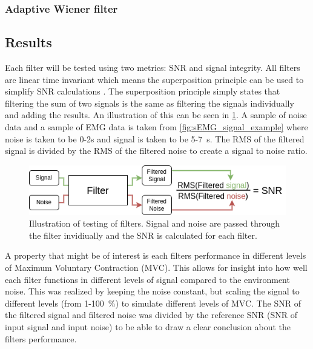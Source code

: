\subsubsection{Adaptive Wiener filter}


\subsection{Results}
Each filter will be tested using two metrics: SNR and signal integrity. All filters are linear time invariant which means the superposition principle can be used to simplify SNR calculations \cite{wiki:lti_system}. The superposition principle simply states that filtering the sum of two signals is the same as filtering the signals individually and adding the results. An illustration of this can be seen in \ref{fig:filter_process}. A sample of noise data and a sample of EMG data is taken from \ref{fig:sEMG_signal_example} where noise is taken to be 0-2s and signal is taken to be 5-\SI{7}{\second}. The RMS of the filtered signal is divided by the RMS of the filtered noise to create a signal to noise ratio.

\begin{figure}[h!t]
	\begin{center}
		\includegraphics[width=1.0\columnwidth]{images/filter_process.png}
	\end{center}
	\caption{Illustration of testing of filters. Signal and noise are passed through the filter invidiually and the SNR is calculated for each filter.}
	\label{fig:filter_process}
\end{figure}

A property that might be of interest is each filters performance in different levels of Maximum Voluntary Contraction (MVC). This allows for insight into how well each filter functions in different levels of signal compared to the environment noise. This was realized by keeping the noise constant, but scaling the signal to different levels (from 1-\SI{100}{\percent}) to simulate different levels of MVC. The SNR of the filtered signal and filtered noise was divided by the reference SNR (SNR of input signal and input noise) to be able to draw a clear conclusion about the filters performance.

